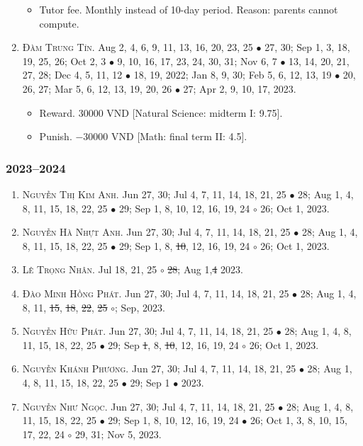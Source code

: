 \documentclass{article}
\begin{document}
\begin{enumerate}
	\begin{itemize}
		\item {\sf Tutor fee.} Monthly instead of 10-day period. Reason: parents cannot compute.
	\end{itemize}
	\item \textsc{Đàm Trung Tín.} {\sf[In]} Aug 2, 4, 6, 9, 11, 13, 16, 20, 23, 25 $\bullet$ 27, 30; Sep 1, 3, 18, 19, 25, 26; Oct 2, 3 $\bullet$ 9, 10, 16, 17, 23, 24, 30, 31; Nov 6, 7 $\bullet$ 13, 14, 20, 21, 27, 28; Dec 4, 5, 11, 12 $\bullet$ 18, 19, 2022; Jan 8, 9, 30; Feb 5, 6, 12, 13, 19 $\bullet$ 20, 26, 27; Mar 5, 6, 12, 13, 19, 20, 26 $\bullet$ 27; Apr 2, 9, 10, 17, 2023. {\sf[Out]}
	\begin{itemize}
		\item {\sf Reward.} 30000 VND [Natural Science: midterm I: 9.75].
		\item {\sf Punish.} $-30000$ VND [Math: final term II: 4.5].
	\end{itemize}
\end{enumerate}

\subsubsection{2023--2024}
 
\begin{enumerate}
	\item \textsc{Nguyễn Thị Kim Anh.} {\sf[In]} Jun 27, 30; Jul 4, 7, 11, 14, 18, 21, 25 $\bullet$ 28; Aug 1, 4, 8, 11, 15, 18, 22, 25 $\bullet$ 29; Sep 1, 8, 10, 12, 16, 19, 24 $\circ$ 26; Oct 1, 2023.
	\item \textsc{Nguyễn Hà Nhựt Anh.} {\sf[In]} Jun 27, 30; Jul 4, 7, 11, 14, 18, 21, 25 $\bullet$ 28; Aug 1, 4, 8, 11, 15, 18, 22, 25 $\bullet$ 29; Sep 1, 8, \st{10}, 12, 16, 19, 24 $\circ$ 26; Oct 1, 2023.
	\item \textsc{Lê Trọng Nhân.} {\sf[In]} Jul 18, 21, 25 $\circ$ \st{28}; Aug 1,\st{4} 2023. \sf{[Out]}
	\item \textsc{Đào Minh Hồng Phát.} {\sf[In]} Jun 27, 30; Jul 4, 7, 11, 14, 18, 21, 25 $\bullet$ 28; Aug 1, 4, 8, 11, \st{15}, \st{18}, \st{22}, \st{25} $\circ$; Sep, 2023. \sf{[Out]}
	\item \textsc{Nguyễn Hữu Phát.} {\sf[In]} Jun 27, 30; Jul 4, 7, 11, 14, 18, 21, 25 $\bullet$ 28; Aug 1, 4, 8, 11, 15, 18, 22, 25 $\bullet$ 29; Sep \st{1}, 8, \st{10}, 12, 16, 19, 24 $\circ$ 26; Oct 1, 2023.
	\item \textsc{Nguyễn Khánh Phương.} {\sf[In]} Jun 27, 30; Jul 4, 7, 11, 14, 18, 21, 25 $\bullet$ 28; Aug 1, 4, 8, 11, 15, 18, 22, 25 $\bullet$ 29; Sep 1 $\bullet$ 2023. \sf{[Out]}
	\item \textsc{Nguyễn Như Ngọc.} {\sf[In]} Jun 27, 30; Jul 4, 7, 11, 14, 18, 21, 25 $\bullet$ 28; Aug 1, 4, 8, 11, 15, 18, 22, 25 $\bullet$ 29; Sep 1, 8, 10, 12, 16, 19, 24 $\bullet$ 26; Oct 1, 3, 8, 10, 15, 17, 22, 24 $\circ$ 29, 31; Nov 5, 2023.
\end{enumerate}
\end{document}
